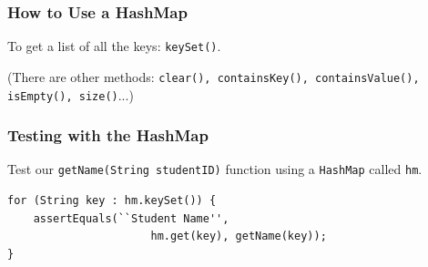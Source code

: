 \begin{frame}
\frametitle{How to Use a HashMap}
\begin{changemargin}{1cm}

To get a list of all the keys: \texttt{keySet()}.

(There are other methods: \texttt{clear(), containsKey(), containsValue(), isEmpty(), size()}...)


\end{changemargin}
\end{frame}

\begin{frame}[fragile]
\frametitle{Testing with the HashMap}
\begin{changemargin}{1cm}

Test our \texttt{getName(String studentID)} function using a \texttt{HashMap} called \texttt{hm}.

{\small
\begin{verbatim}
for (String key : hm.keySet()) {
    assertEquals(``Student Name'', 
                      hm.get(key), getName(key));
}
\end{verbatim}
}

\end{changemargin}
\end{frame}


